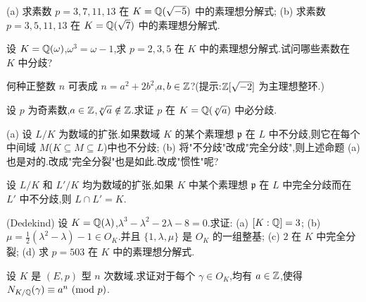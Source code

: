 \begin{Exercises}
  \item (a) 求素数 $p=3,7,11,13$ 在 $K=\mathbb{Q}(\sqrt{-5})$ 中的素理想分解式;
        (b) 求素数 $p=3,5,11,13$ 在 $K=\mathbb{Q}(\sqrt{7})$ 中的素理想分解式.
  \item 设 $K=\mathbb{Q}(\omega)$,$\omega^3=\omega-1$,求 $p=2,3,5$ 在 $K$ 中的素理想分解式.试问哪些素数在 $K$ 中分歧?
  \item 何种正整数 $n$ 可表成 $n=a^2+2b^2$,$a,b\in\mathbb{Z}$?(提示:$\mathbb{Z}[\sqrt{-2}]$ 为主理想整环.)
  \item 设 $p$ 为奇素数,$a\in\mathbb{Z}$,$\sqrt[p]{a}\notin\mathbb{Z}$.求证 $p$ 在 $K=\mathbb{Q}(\sqrt[p]{a})$ 中必分歧.
  \item (a) 设 $L/K$ 为数域的扩张.如果数域 $K$ 的某个素理想 $\mathfrak{p}$ 在 $L$ 中不分歧,则它在每个中间域 $M$($K\subseteq M\subseteq L$)中也不分歧;
        (b) 将"不分歧"改成"完全分歧",则上述命题 (a) 也是对的.改成"完全分裂"也是如此.改成"惯性"呢?
  \item 设 $L/K$ 和 $L'/K$ 均为数域的扩张,如果 $K$ 中某个素理想 $\mathfrak{p}$ 在 $L$ 中完全分歧而在 $L'$ 中不分歧,则 $L\cap L'=K$.
  \item (Dedekind) 设 $K=\mathbb{Q}(\lambda)$,$\lambda^3-\lambda^2-2\lambda-8=0$.求证:
        (a) $[K:\mathbb{Q}]=3$;
        (b) $\mu=\frac{1}{2}(\lambda^2-\lambda)-1\in O_K$.并且 $\{1,\lambda,\mu\}$ 是 $O_K$ 的一组整基;
        (c) $2$ 在 $K$ 中完全分裂;
        (d) 求 $p=503$ 在 $K$ 中的素理想分解式.
  \item 设 $K$ 是 $(E,p)$ 型 $n$ 次数域.求证对于每个 $\gamma\in O_K$,均有 $a\in\mathbb{Z}$,使得 $N_{K/\Q}(\gamma)\equiv a^n\ (\mathrm{mod}\ p)$.
\end{Exercises}
